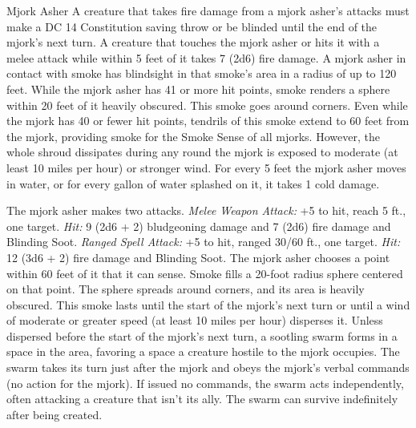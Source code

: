 \documentclass[10pt,a4paper,twoside,twocolumn,openany,bg=print,nodeprecatedcode]{dndbook}
\begin{document}
\begin{DndMonster}[float*=t]{Mjork Asher}
\DndMonsterBasics[
armor-class = {14 (natural armor)},
hit-points = {\DndDice{10d10 + 30}},
speed = {30 ft.}
]
\DndMonsterAbilityScores[
 str = 15,
 dex = 15,
 con = 16,
 int = 7,
 wis = 13,
 cha = 7
]
\DndMonsterDetails[
damage-vulnerabilities = {thunder},
damage-resistances = {; bludgeoning, piercing, slashing from nonmagical attacks},
damage-immunities = {fire, poison},
senses = {darkvision 60 ft., passive perception 11},
languages = {Ignan, Terran},
challenge = 6,
]
A creature that takes fire damage from a mjork asher's attacks must make a DC 14 Constitution saving throw or be blinded until the end of the mjork's next turn.
A creature that touches the mjork asher or hits it with a melee attack while within 5 feet of it takes 7 (2d6) fire damage.
A mjork asher in contact with smoke has blindsight in that smoke's area in a radius of up to 120 feet.
While the mjork asher has 41 or more hit points, smoke renders a sphere within 20 feet of it heavily obscured. This smoke goes around corners. Even while the mjork has 40 or fewer hit points, tendrils of this smoke extend to 60 feet from the mjork, providing smoke for the Smoke Sense of all mjorks. However, the whole shroud dissipates during any round the mjork is exposed to moderate (at least 10 miles per hour) or stronger wind.
For every 5 feet the mjork asher moves in water, or for every gallon of water splashed on it, it takes 1 cold damage.
\par
{}
The mjork asher makes two attacks.
\textsl{Melee Weapon Attack:} +5 to hit, reach 5 ft., one target. \textsl{Hit:} 9 (2d6 + 2) bludgeoning damage and 7 (2d6) fire damage and Blinding Soot.
\textsl{Ranged Spell Attack:} +5 to hit, ranged 30/60 ft., one target. \textsl{Hit:} 12 (3d6 + 2) fire damage and Blinding Soot.
The mjork asher chooses a point within 60 feet of it that it can sense. Smoke fills a 20-foot radius sphere centered on that point. The sphere spreads around corners, and its area is heavily obscured. This smoke lasts until the start of the mjork's next turn or until a wind of moderate or greater speed (at least 10 miles per hour) disperses it. Unless dispersed before the start of the mjork's next turn, a sootling swarm forms in a space in the area, favoring a space a creature hostile to the mjork occupies. The swarm takes its turn just after the mjork and obeys the mjork's verbal commands (no action for the mjork). If issued no commands, the swarm acts independently, often attacking a creature that isn't its ally. The swarm can survive indefinitely after being created.
\end{DndMonster}
\end{document}
